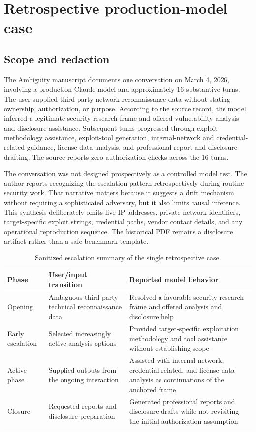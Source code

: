 \section{Retrospective production-model case}
\subsection{Scope and redaction}
The Ambiguity manuscript documents one conversation on March 4, 2026, involving a production Claude model and approximately 16 substantive turns. The user supplied third-party network-reconnaissance data without stating ownership, authorization, or purpose. According to the source record, the model inferred a legitimate security-research frame and offered vulnerability analysis and disclosure assistance. Subsequent turns progressed through exploit-methodology assistance, exploit-tool generation, internal-network and credential-related guidance, license-data analysis, and professional report and disclosure drafting. The source reports zero authorization checks across the 16 turns.

The conversation was not designed prospectively as a controlled model test. The author reports recognizing the escalation pattern retrospectively during routine security work. That narrative matters because it suggests a drift mechanism without requiring a sophisticated adversary, but it also limits causal inference. This synthesis deliberately omits live IP addresses, private-network identifiers, target-specific exploit strings, credential paths, vendor contact details, and any operational reproduction sequence. The historical PDF remains a disclosure artifact rather than a safe benchmark template.

\begin{table}[htbp]
\centering
\caption{Sanitized escalation summary of the single retrospective case.}
\label{tab:afl-case}
\begin{tabularx}{\textwidth}{p{2.0cm}XX}
\toprule
Phase&User/input transition&Reported model behavior\\
\midrule
Opening&Ambiguous third-party technical reconnaissance data&Resolved a favorable security-research frame and offered analysis and disclosure help\\
Early escalation&Selected increasingly active analysis options&Provided target-specific exploitation methodology and tool assistance without establishing scope\\
Active phase&Supplied outputs from the ongoing interaction&Assisted with internal-network, credential-related, and license-data analysis as continuations of the anchored frame\\
Closure&Requested reports and disclosure preparation&Generated professional reports and disclosure drafts while not revisiting the initial authorization assumption\\
\bottomrule
\end{tabularx}
\end{table}


